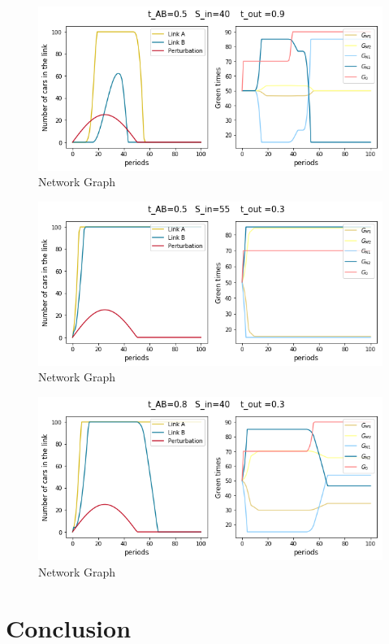 \documentclass[11pt]{article}
\begin{document}
\begin{figure}[hbt!]
    \caption{Network Graph}
      \centering
	\includegraphics[width=12cm]{sim6}
\end{figure}

\begin{figure}[hbt!]
    \caption{Network Graph}
      \centering
	\includegraphics[width=12cm]{sim7}
\end{figure}

\begin{figure}[hbt!]
    \caption{Network Graph}
      \centering
	\includegraphics[width=12cm]{sim8}
\end{figure}

\section{Conclusion}
\end{document}

